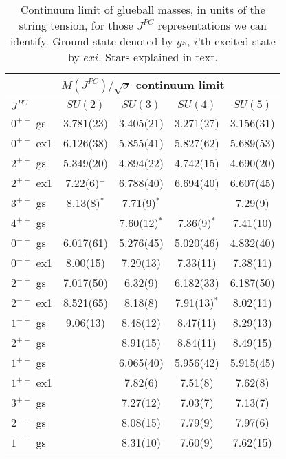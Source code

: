 \documentclass[12pt]{article}
\begin{document}
\begin{table}[htb]
\centering
\begin{tabular}{|l|c|c|c|c|} \hline
\multicolumn{5}{|c|}{$M(J^{PC})/\surd\sigma$ continuum limit} \\ \hline
  $J^{PC}$      & $SU(2)$ & $SU(3)$ & $SU(4)$ & $SU(5)$ \\ \hline
 $0^{++}$ {gs}   & 3.781(23)  & 3.405(21)  & 3.271(27)  & 3.156(31)  \\
 $0^{++}$ {ex1}  & 6.126(38)  & 5.855(41)  & 5.827(62)  & 5.689(53)  \\
 $2^{++}$ {gs}   & 5.349(20)  & 4.894(22)  & 4.742(15)  & 4.690(20)  \\
 $2^{++}$ {ex1}  & 7.22(6)$^+$ & 6.788(40) & 6.694(40)  & 6.607(45)  \\
 $3^{++}$ {gs}   & 8.13(8)$^*$ & 7.71(9)$^*$ &          & 7.29(9)     \\ 
 $4^{++}$ {gs}   &            & 7.60(12)$^*$ & 7.36(9)$^*$ & 7.41(10) \\ \hline
 $0^{-+}$ {gs}   & 6.017(61)  & 5.276(45)  & 5.020(46)  & 4.832(40)  \\ 
 $0^{-+}$ {ex1}  & 8.00(15)   & 7.29(13)   & 7.33(11)   & 7.38(11)  \\
 $2^{-+}$ {gs}   & 7.017(50)  & 6.32(9)    & 6.182(33)  & 6.187(50)  \\
 $2^{-+}$ {ex1}  & 8.521(65)  & 8.18(8)    & 7.91(13)$^*$ & 8.02(11)  \\
 $1^{-+}$ {gs}   & 9.06(13)   & 8.48(12)   & 8.47(11)   & 8.29(13)  \\ \hline
 $2^{+-}$ {gs}   &            & 8.91(15)   & 8.84(11)   &  8.49(15)  \\
 $1^{+-}$ {gs}   &            & 6.065(40)  & 5.956(42)  & 5.915(45)  \\
 $1^{+-}$ {ex1}  &            & 7.82(6)    & 7.51(8)    & 7.62(8)  \\
 $3^{+-}$ {gs}   &            & 7.27(12)   & 7.03(7)    & 7.13(7)  \\  \hline
 $2^{--}$ {gs}   &            & 8.08(15)   & 7.79(9)   & 7.97(6)  \\
 $1^{--}$ {gs}   &            & 8.31(10)   & 7.60(9)   & 7.62(15)  \\ \hline
\end{tabular}
\caption{Continuum limit of glueball masses, in units of the string tension,
  for those $J^{PC}$ representations we can identify. Ground state denoted by $gs$,
  $i$'th excited state by $exi$. Stars explained in text.}
\label{table_MKJ_N2-5}
\end{table}
\end{document}
